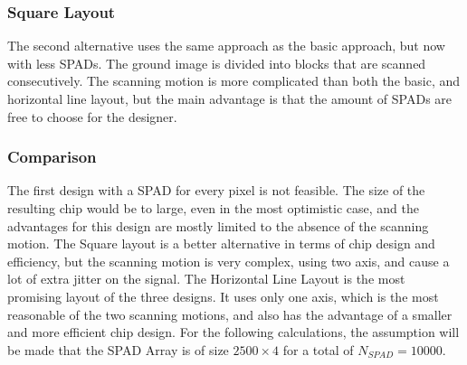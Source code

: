 \subsubsection*{Square Layout}
The second alternative uses the same approach as the basic approach, but now with less SPADs. The ground image is divided into blocks that are scanned consecutively. The scanning motion is more complicated than both the basic, and horizontal line layout, but the main advantage is that the amount of SPADs are free to choose for the designer.

\subsubsection*{Comparison}
The first design with a SPAD for every pixel is not feasible. The size of the resulting chip would be to large, even in the most optimistic case, and the advantages for this design are mostly limited to the absence of the scanning motion. The Square layout is a better alternative in terms of chip design and efficiency, but the scanning motion is very complex, using two axis, and cause a lot of extra jitter on the signal. The Horizontal Line Layout is the most promising layout of the three designs. It uses only one axis, which is the most reasonable of the two scanning motions, and also has the advantage of a smaller and more efficient chip design. For the following calculations, the assumption will be made that the SPAD Array is of size $2500 \times 4$ for a total of $N_{SPAD} = 10000$.
